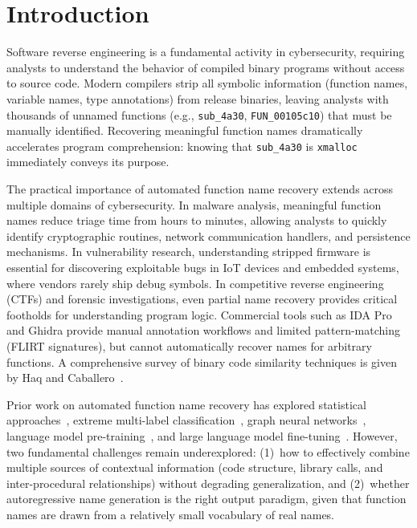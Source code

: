 \documentclass[sigconf,nonacm]{acmart}
\begin{document}
\maketitle
\hypersetup{colorlinks=true,linkcolor=blue,citecolor=blue,urlcolor=blue}

\section{Introduction}
\label{sec:intro}

Software reverse engineering is a fundamental activity in cybersecurity, requiring analysts to understand the behavior of compiled binary programs without access to source code. Modern compilers strip all symbolic information (function names, variable names, type annotations) from release binaries, leaving analysts with thousands of unnamed functions (e.g., \texttt{sub\_4a30}, \texttt{FUN\_00105c10}) that must be manually identified. Recovering meaningful function names dramatically accelerates program comprehension: knowing that \texttt{sub\_4a30} is \texttt{xmalloc} immediately conveys its purpose.

The practical importance of automated function name recovery extends across multiple domains of cybersecurity. In malware analysis, meaningful function names reduce triage time from hours to minutes, allowing analysts to quickly identify cryptographic routines, network communication handlers, and persistence mechanisms. In vulnerability research, understanding stripped firmware is essential for discovering exploitable bugs in IoT devices and embedded systems, where vendors rarely ship debug symbols. In competitive reverse engineering (CTFs) and forensic investigations, even partial name recovery provides critical footholds for understanding program logic. Commercial tools such as IDA Pro and Ghidra provide manual annotation workflows and limited pattern-matching (FLIRT signatures), but cannot automatically recover names for arbitrary functions. A comprehensive survey of binary code similarity techniques is given by Haq and Caballero~\cite{haqsurvey}.

Prior work on automated function name recovery has explored statistical approaches~\cite{debin}, extreme multi-label classification~\cite{xfl}, graph neural networks~\cite{nero}, language model pre-training~\cite{symlm}, and large language model fine-tuning~\cite{symgen}. However, two fundamental challenges remain underexplored: (1)~how to effectively combine multiple sources of contextual information (code structure, library calls, and inter-procedural relationships) without degrading generalization, and (2)~whether autoregressive name generation is the right output paradigm, given that function names are drawn from a relatively small vocabulary of real names.
\end{document}
